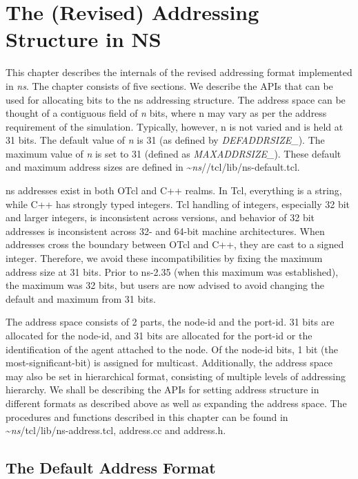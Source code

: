\chapter{The (Revised) Addressing Structure in NS}
\label{chap:Address}

This chapter describes the internals of the revised addressing format
implemented in \emph{ns}. The chapter consists of five sections. We
describe the APIs that can be used for allocating bits to the ns addressing
structure. The address space can be thought
of a contiguous field of {\em n} bits, where n may vary as per the
address requirement of the simulation. Typically, however, n is not varied
and is held at 31 bits.  The default value of {\em n} is
31 (as defined by {\em DEFADDRSIZE\_}). The maximum value of {\em n} is
set to 31 (defined as {\em MAXADDRSIZE\_}). These default and maximum 
address sizes are defined in \textasciitilde\emph{ns}/{/tcl/lib/ns-default.tcl}.

ns addresses exist in both OTcl and C++ realms.  In Tcl, everything is
a string, while C++ has strongly typed integers.  Tcl handling of integers,
especially 32 bit and larger integers, is inconsistent across versions, and
behavior of 32 bit addresses is inconsistent across 32- and 64-bit 
machine architectures.  When addresses cross the boundary between OTcl and
C++, they are cast to a signed integer.  Therefore, we avoid these 
incompatibilities by fixing the maximum address size at 31 bits.  
Prior to ns-2.35 (when
this maximum was established), the maximum was 32 bits, but users are now
advised to avoid changing the default and maximum from 31 bits.

The address space consists of 2 parts, the node-id and the port-id.
31 bits are allocated for the node-id, and 31 bits are allocated for the 
port-id or
the identification of the agent attached to the node. Of the node-id
bits, 1 bit (the most-significant-bit) is assigned for multicast. 
Additionally, the address space may
also be set in hierarchical format, consisting of multiple levels of
addressing hierarchy. 
We shall be describing the APIs for setting address structure in
different formats as described above as well as expanding the address
space. 
The procedures and functions described in this chapter can be found in
\textasciitilde\emph{ns}/{tcl/lib/ns-address.tcl, address.cc and address.h}.

\section{The Default Address Format}
\label{sec:defaultFormat}

